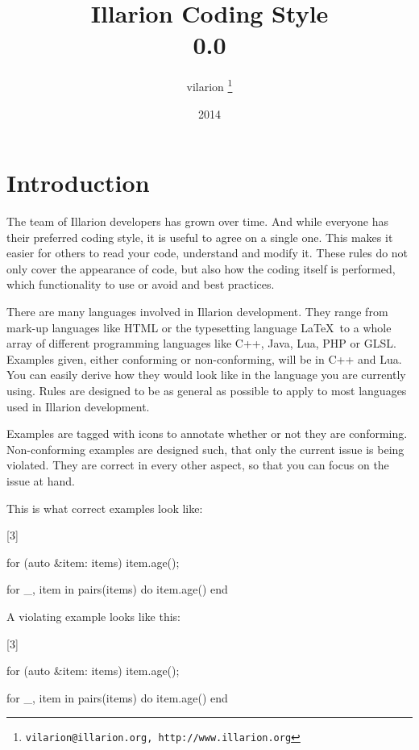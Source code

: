 \documentclass[a4paper,11pt]{scrreprt}
\newcommand{\marginMarker}[1]{%
\marginnote{%
    \hfill%
		\Huge{#1}%
}[3\baselineskip]%
}
\newcommand{\conforming}{%
\marginMarker{\textcolor{green}{\ding{51}}}%
}
\newcommand{\nonconforming}{%
\marginMarker{\textcolor{red}{\ding{55}}}%
}
\begin{document}
\title{Illarion Coding Style\\0.0}
\author{vilarion \thanks{ \texttt{vilarion@illarion.org, http://www.illarion.org}}}
\date{2014}
\maketitle
\tableofcontents

\chapter{Introduction}
The team of Illarion developers has grown over time. And while everyone has their preferred coding style, it is useful to agree on a single one. This makes it easier for others to read your code, understand and modify it. These rules do not only cover the appearance of code, but also how the coding itself is performed, which functionality to use or avoid and best practices.

There are many languages involved in Illarion development. They range from mark-up languages like HTML or the typesetting language \LaTeX\ to a whole array of different programming languages like C++, Java, Lua, PHP or GLSL. Examples given, either conforming or non-conforming, will be in C++ and Lua. You can easily derive how they would look like in the language you are currently using. Rules are designed to be as general as possible to apply to most languages used in Illarion development.

Examples are tagged with icons to annotate whether or not they are conforming. Non-conforming examples are designed such, that only the current issue is being violated. They are correct in every other aspect, so that you can focus on the issue at hand.

This is what correct examples look like:

\conforming{}
\begin{cppBox}
for (auto &item: items) {
    item.age();
}
\end{cppBox}
\begin{luaBox}
for _, item in pairs(items) do
    item.age()
end
\end{luaBox}

A violating example looks like this:

\nonconforming{}
\begin{cppBox}
for (auto &item: items)
{
    item.age();
}
\end{cppBox}
\begin{luaBox}
for _, item in pairs(items)
do
    item.age()
end
\end{luaBox}
\end{document}
